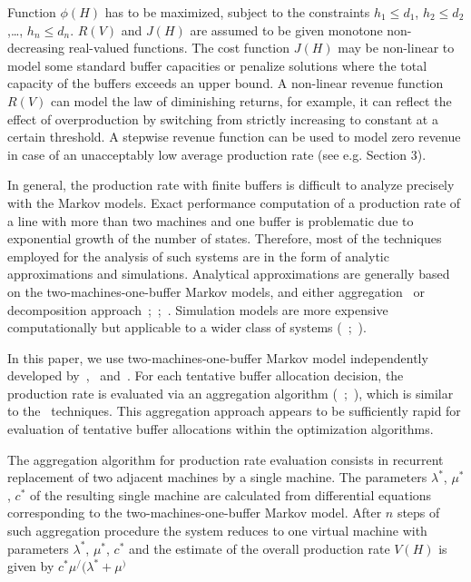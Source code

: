 \documentclass{ifacconf}
\begin{document}
Function $\phi(H)$ has to be maximized, subject to the constraints $h_1 \leq d_1$, $h_2 \leq d_2$,…, $h_n \leq d_n$.
$R(V)$ and $J(H)$ are assumed to be given monotone non-decreasing real-valued functions. 
The cost function $J(H)$ may be non-linear to model some standard buffer capacities or 
penalize  solutions  where  the  total  capacity  of  the  buffers  exceeds  an  upper  bound. A 
non-linear revenue function $R(V)$ can model the law of diminishing returns, for example, 
it  can  reflect  the  effect  of  overproduction  by  switching  from  strictly  increasing  to 
constant at a certain threshold. A stepwise revenue function can be used to model zero 
revenue  in  case  of  an  unacceptably  low  average  production  rate  (see  e.g.  Section  3). 

In general, the production rate with finite buffers is difficult to analyze precisely with 
the Markov models. Exact performance computation of a production rate of a line with 
more than two machines and one buffer is problematic due to exponential growth of the 
number of states. Therefore, most of the techniques employed for the analysis of such 
systems are in the form of analytic approximations and simulations. Analytical 
approximations are generally based on the two-machines-one-buffer Markov models, 
and either aggregation~\cite{DeKoster87} or decomposition approach~\cite{DalXie89};~\cite{Gers87};~\cite{Li2005}. Simulation models are more expensive 
computationally but applicable to a wider class of systems (~\cite{DS95};~\cite{SorJan2004}). 
 




In this paper, we use two-machines-one-buffer Markov model independently developed 
by~\cite{LP},~\cite{DF} and~\cite{Proth84}. For 
each tentative buffer allocation decision, the production rate is evaluated via an 
aggregation algorithm (~\cite{Dolgui93};~\cite{DS95}), which is similar to the~\cite{TD87} techniques. 
This aggregation approach appears to be 
sufficiently rapid for evaluation of tentative buffer allocations within the optimization 
algorithms.  
 
The aggregation algorithm for production rate evaluation consists in recurrent 
replacement of two adjacent machines by a single machine. The parameters $\lambda^*$, $\mu^*$, $c^*$ of 
the resulting single machine are calculated from differential equations corresponding to
the two-machines-one-buffer Markov model. After $n$ steps of such aggregation 
procedure the system reduces to one virtual machine with parameters $\lambda^*$, $\mu^*$, $c^*$ and the 
estimate of the overall production rate $V(H)$ is given by $c^*\mu^/(\lambda^*+\mu^)$
\end{document}
